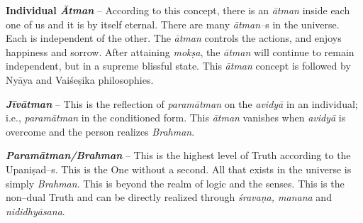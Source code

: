\textbf{Individual \textit{Ātman}} – According to this concept, there is an \textit{ātman} inside each one of us and it is by itself eternal. There are many \textit{ātman–}s in the universe. Each is independent of the other. The \textit{ātman} controls the actions, and enjoys happiness and sorrow. After attaining \textit{mokṣa}, the \textit{ātman} will continue to remain independent, but in a supreme blissful state. This \textit{ātman} concept is followed by Nyāya and Vaiśeṣika philosophies.

\textit{\textbf{Jīvātman}} – This is the reflection of \textit{paramātman} on the \textit{avidyā} in an individual; i.e., \textit{paramātman} in the conditioned form. This \textit{ātman} vanishes when \textit{avidyā} is overcome and the person realizes \textit{Brahman}.

\textbf{\textit{Paramātman/Brahman}} – This is the highest level of Truth according to the Upaniṣad–s. This is the One without a second. All that exists in the universe is simply \textit{Brahman}. This is beyond the realm of logic and the senses. This is the non–dual Truth and can be directly realized through \textit{śravaṇa, manana} and \textit{nididhyāsana}.

